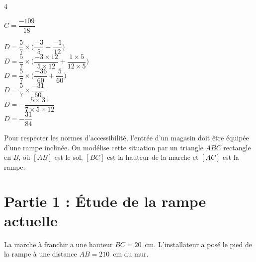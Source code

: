 \documentclass[a4paper]{book}
\begin{document}
{\begin{exerciceNote}{4}
\begin{minipage}{0.24\linewidth}
            $C = \dfrac{-109}{18}$
        \end{minipage}
        \hfill\vline\hfill
        \begin{minipage}{0.24\linewidth}
            $D = \dfrac{5}{7}\times\bigg(\dfrac{-3}{5}-\dfrac{-1}{12}\bigg)$ \\[2ex]

            $D = \dfrac{5}{7}\times\bigg(\dfrac{-3\times12}{5\times12}+\dfrac{1\times5}{12\times5}\bigg)$ \\[2ex]

            $D = \dfrac{5}{7}\times\bigg(\dfrac{-36}{60}+\dfrac{5}{60}\bigg)$ \\[2ex]

            $D = \dfrac{5}{7}\times\dfrac{-31}{60}$ \\[2ex]

            $D = -\dfrac{5\times31}{7\times5\times12}$ \\[2ex]

            $D = -\dfrac{31}{84}$
        \end{minipage}     
    \end{exerciceNote}


\newpage


    \begin{exercice}
        \noindent Pour respecter les normes d'accessibilité, l'entrée d'un magasin doit être équipée d'une rampe inclinée. On modélise cette situation par un triangle $ABC$ rectangle en $B$, où $[AB]$ est le sol, $[BC]$ est la hauteur de la marche et $[AC]$ est la rampe.

        \section*{Partie 1 : Étude de la rampe actuelle}
        La marche à franchir a une hauteur $BC = 20$~cm. L'installateur a posé le pied de la rampe à une distance $AB = 210$~cm du mur.

        \begin{center}
\end{center}
\end{exercice}}
\end{document}
